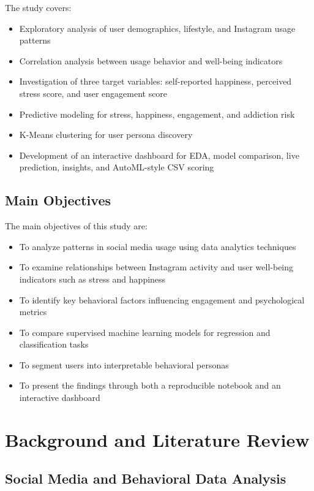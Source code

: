 \documentclass[12pt,a4paper]{article}
\begin{document}
The study covers:
\begin{itemize}
    \item Exploratory analysis of user demographics, lifestyle, and Instagram usage patterns
    \item Correlation analysis between usage behavior and well-being indicators
    \item Investigation of three target variables: self-reported happiness, perceived stress score, and user engagement score
    \item Predictive modeling for stress, happiness, engagement, and addiction risk
    \item K-Means clustering for user persona discovery
    \item Development of an interactive dashboard for EDA, model comparison, live prediction, insights, and AutoML-style CSV scoring
\end{itemize}

\subsection{Main Objectives}

The main objectives of this study are:
\begin{itemize}
    \item To analyze patterns in social media usage using data analytics techniques
    \item To examine relationships between Instagram activity and user well-being indicators such as stress and happiness
    \item To identify key behavioral factors influencing engagement and psychological metrics
    \item To compare supervised machine learning models for regression and classification tasks
    \item To segment users into interpretable behavioral personas
    \item To present the findings through both a reproducible notebook and an interactive dashboard
\end{itemize}

\section{Background and Literature Review}

\subsection{Social Media and Behavioral Data Analysis}
\end{document}
